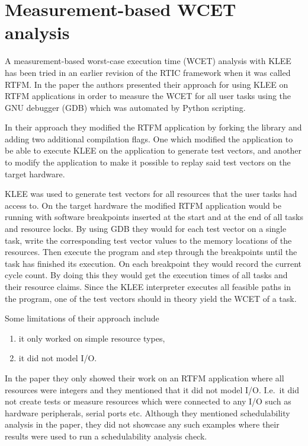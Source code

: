 \section{Measurement-based WCET analysis}
A measurement-based worst-case execution time (WCET) analysis with KLEE has
been tried in an earlier revision of the RTIC framework when it was called
RTFM\cite{lindner}. In the paper the authors presented their approach for using
KLEE on RTFM applications in order to measure the WCET for all user tasks
using the GNU debugger (GDB) which was automated by Python scripting.

In their approach they modified the RTFM application by forking the library and
adding two additional compilation flags. One which modified the application to be
able to execute KLEE on the application to generate test vectors, and another
to modify the application to make it possible to replay said test vectors on
the target hardware.

KLEE was used to generate test vectors for all resources that the user tasks
had access to. On the target hardware the modified RTFM application would be
running with software breakpoints inserted at the start and at the end of all
tasks and resource locks. By using GDB they would for each test vector on a
single task, write the corresponding test vector values to the memory locations
of the resources. Then execute the program and step through the breakpoints
until the task has finished its execution. On each breakpoint they would record
the current cycle count. By doing this they would get the execution times of
all tasks and their resource claims. Since the KLEE interpreter executes all
feasible paths in the program, one of the test vectors should in theory yield
the WCET of a task.

Some limitations of their approach include
\begin{enumerate}
    \item it only worked on simple resource types,
    \item it did not model I/O.
\end{enumerate}
In the paper they only showed their work on an RTFM application where all
resources were integers and they mentioned that it did not model I/O. I.e.\
it did not create tests or measure resources which were connected to any I/O
such as hardware peripherals, serial ports etc. Although they mentioned
schedulability analysis in the paper, they did not showcase any such examples
where their results were used to run a schedulability analysis check.

